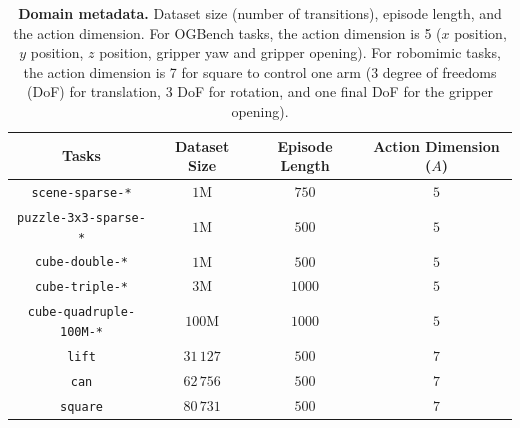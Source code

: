 \begin{table}[ht]
    \centering
    \begin{tabular}{@{}cccc@{}}
        \toprule
        \textbf{Tasks} & \textbf{Dataset Size}  & \textbf{Episode Length} & \textbf{Action Dimension ($A$)} \\
        \midrule
        \texttt{scene-sparse-*}       &  $1$M & $750$ & $5$\\
        \texttt{puzzle-3x3-sparse-*}  &  $1$M & $500$ & $5$\\
        \texttt{cube-double-*} &  $1$M & $500$ & $5$\\
        \texttt{cube-triple-*} &  $3$M & $1000$ & $5$\\
        \texttt{cube-quadruple-100M-*} &  $100$M & $1000$ & $5$\\
        \texttt{lift}        &  $31\,127$& $500$ & $7$\\
        \texttt{can}        &  $62\,756$ & $500$ & $7$\\
        \texttt{square}        &  $80\,731$ & $500$ & $7$\\
    \bottomrule
    \end{tabular}
    \vspace{2mm}
    \caption{\footnotesize \textbf{Domain metadata.} Dataset size (number of transitions), episode length, and the action dimension. For OGBench tasks, the action dimension is 5 ($x$ position, $y$ position, $z$ position, gripper yaw and gripper opening). For robomimic tasks, the action dimension is 7 for square to control one arm (3 degree of freedoms (DoF) for translation, 3 DoF for rotation, and one final DoF for the gripper opening).}

    \label{tab:metadata}
\end{table}



